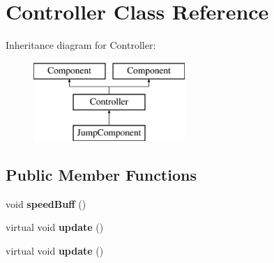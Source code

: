 \hypertarget{class_controller}{\section{Controller Class Reference}
\label{class_controller}
}
Inheritance diagram for Controller\-:\begin{figure}[H]
\begin{center}
\leavevmode
\includegraphics[height=3.000000cm]{class_controller}
\end{center}
\end{figure}
\subsection*{Public Member Functions}
\begin{DoxyCompactItemize}
\item 
\hypertarget{class_controller_a3656509ec1889b0d8f8278081ddb429b}{void {\bfseries speed\-Buff} ()}\label{class_controller_a3656509ec1889b0d8f8278081ddb429b}

\item 
\hypertarget{class_controller_aafbda9ee5746c9c0cfb9d1d667b3870d}{virtual void {\bfseries update} ()}\label{class_controller_aafbda9ee5746c9c0cfb9d1d667b3870d}

\item 
\hypertarget{class_controller_aafbda9ee5746c9c0cfb9d1d667b3870d}{virtual void {\bfseries update} ()}\label{class_controller_aafbda9ee5746c9c0cfb9d1d667b3870d}

\end{DoxyCompactItemize}
